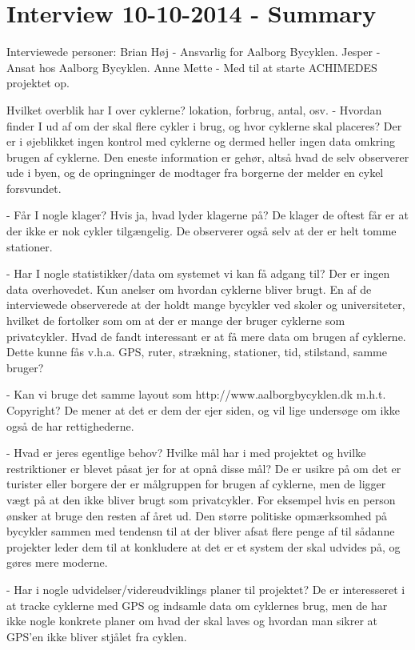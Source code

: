 \chapter{Interview 10-10-2014 - Summary}
\label{interviewReferat}
Interviewede personer:
Brian Høj - Ansvarlig for Aalborg Bycyklen.
Jesper - Ansat hos Aalborg Bycyklen.
Anne Mette - Med til at starte ACHIMEDES projektet op.

Hvilket overblik har I over cyklerne? lokation, forbrug, antal, osv.
- Hvordan finder I ud af om der skal flere cykler i brug, og hvor cyklerne skal placeres?
Der er i øjeblikket ingen kontrol med cyklerne og dermed heller ingen  data omkring brugen
af cyklerne. Den eneste information er gehør, altså hvad de selv observerer ude i byen,
og de opringninger de modtager fra borgerne der melder en cykel forsvundet.

- Får I nogle klager? Hvis ja, hvad lyder klagerne på?
De klager de oftest får er at der ikke er nok cykler tilgængelig. De observerer også selv
at der er helt tomme stationer.

- Har I nogle statistikker/data om systemet vi kan få adgang til?
Der er ingen data overhovedet. Kun anelser om hvordan cyklerne bliver brugt. En af de interviewede
observerede at der holdt mange bycykler ved skoler og universiteter, hvilket de fortolker som om
at der er mange der bruger cyklerne som privatcykler.
Hvad de fandt interessant er at få mere data om brugen af cyklerne. Dette kunne fås v.h.a. GPS, ruter, strækning, stationer, tid, 
stilstand, samme bruger?

- Kan vi bruge det samme layout som http://www.aalborgbycyklen.dk m.h.t. Copyright?
De mener at det er dem der ejer siden, og vil lige undersøge om ikke også de har rettighederne.

- Hvad er jeres egentlige behov? Hvilke mål har i med projektet og hvilke restriktioner er blevet påsat jer for at opnå disse mål?
De er usikre på om det er turister eller borgere der er målgruppen for brugen af cyklerne, men de ligger vægt på at den ikke
bliver brugt som privatcykler. For eksempel hvis en person ønsker at bruge den resten af året ud.
Den større politiske opmærksomhed på bycykler sammen med tendensn til at der bliver afsat flere penge af til sådanne projekter
leder dem til at konkludere at det er et system der skal udvides på, og gøres mere moderne.

- Har i nogle udvidelser/videreudviklings planer til projektet?
De er interesseret i at tracke cyklerne med GPS og indsamle data om cyklernes brug, men de har ikke nogle konkrete planer om hvad
der skal laves og hvordan man sikrer at GPS'en ikke bliver stjålet fra cyklen.

